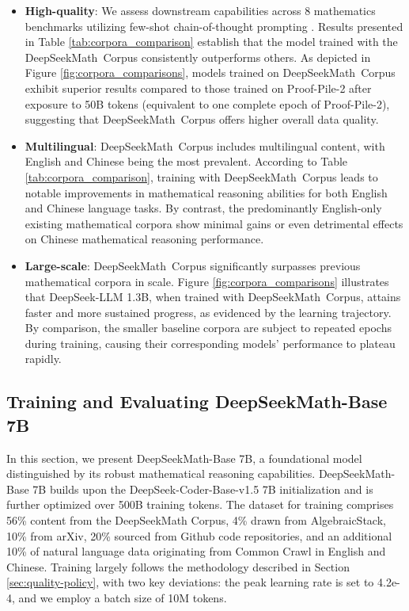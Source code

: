 \begin{itemize}[topsep=0pt]
\begin{itemize}[topsep=0pt]
    \item \textbf{High-quality}:
    We assess downstream capabilities across 8 mathematics benchmarks utilizing few-shot chain-of-thought prompting \cite{cot}. Results presented in Table \ref{tab:corpora_comparison} establish that the model trained with the DeepSeekMath~Corpus consistently outperforms others. As depicted in Figure \ref{fig:corpora_comparisons}, models trained on DeepSeekMath~Corpus exhibit superior results compared to those trained on Proof-Pile-2 after exposure to 50B tokens (equivalent to one complete epoch of Proof-Pile-2), suggesting that DeepSeekMath~Corpus offers higher overall data quality.
    \item \textbf{Multilingual}:
    DeepSeekMath~Corpus includes multilingual content, with English and Chinese being the most prevalent. According to Table \ref{tab:corpora_comparison}, training with DeepSeekMath~Corpus leads to notable improvements in mathematical reasoning abilities for both English and Chinese language tasks. By contrast, the predominantly English-only existing mathematical corpora show minimal gains or even detrimental effects on Chinese mathematical reasoning performance.
    \item \textbf{Large-scale}:
    DeepSeekMath~Corpus significantly surpasses previous mathematical corpora in scale. Figure \ref{fig:corpora_comparisons} illustrates that DeepSeek-LLM 1.3B, when trained with DeepSeekMath~Corpus, attains faster and more sustained progress, as evidenced by the learning trajectory. By comparison, the smaller baseline corpora are subject to repeated epochs during training, causing their corresponding models' performance to plateau rapidly.
\end{itemize}

\subsection{Training and Evaluating DeepSeekMath-Base 7B}

In this section, we present DeepSeekMath-Base 7B, a foundational model distinguished by its robust mathematical reasoning capabilities. DeepSeekMath-Base 7B builds upon the DeepSeek-Coder-Base-v1.5 7B initialization \citep{deepseek-coder} and is further optimized over 500B training tokens. The dataset for training comprises 56\% content from the DeepSeekMath Corpus, 4\% drawn from AlgebraicStack, 10\% from arXiv, 20\% sourced from Github code repositories, and an additional 10\% of natural language data originating from Common Crawl in English and Chinese. Training largely follows the methodology described in Section \ref{sec:quality-policy}, with two key deviations: the peak learning rate is set to 4.2e-4, and we employ a batch size of 10M tokens.


\end{itemize}
